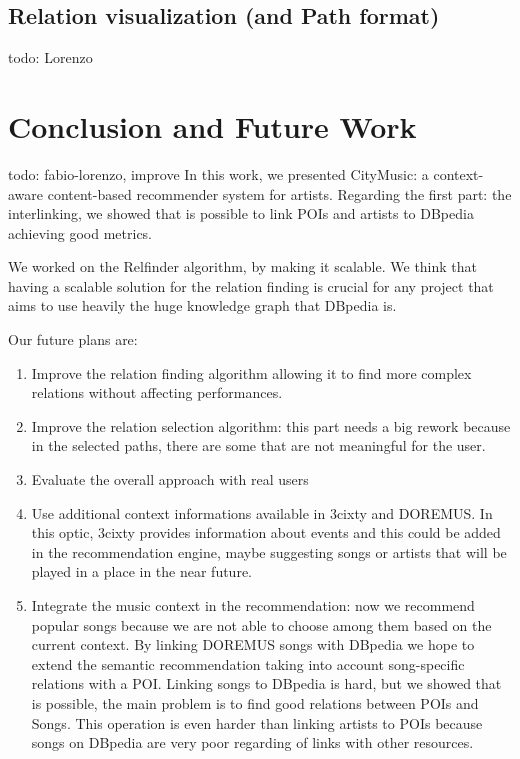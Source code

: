 \documentclass[paper=a4, fontsize=11pt]{scrartcl}
\begin{document}
\subsection{Relation visualization (and Path format)}
todo: Lorenzo
\section{Conclusion and Future Work}
todo: fabio-lorenzo, improve
In this work, we presented CityMusic: a context-aware content-based recommender system for artists. 
Regarding the first part: the interlinking, we showed that is possible to link POIs and artists to DBpedia achieving good metrics.

We worked on the Relfinder algorithm, by making it scalable. We think that having a scalable solution for the relation finding is crucial for any project that aims to use heavily the huge knowledge graph that DBpedia is.

Our future plans are:
\begin{enumerate}
\item Improve the relation finding algorithm allowing it to find more complex relations without affecting performances.
\item Improve the relation selection algorithm: this part needs a big rework because in the selected paths, there are some that are not meaningful for the user.
\item Evaluate the overall approach with real users 
\item Use additional context informations available in 3cixty and DOREMUS. In this optic, 3cixty provides information about events and this could be added in the recommendation engine, maybe suggesting songs or artists that will be played in a place in the near future.
\item Integrate the music context in the recommendation: now we recommend popular songs because we are not able to choose among them based on the current context. By linking DOREMUS songs with DBpedia we hope to extend the semantic recommendation taking into account song-specific relations with a POI. Linking songs to DBpedia is hard, but we showed that is possible, the main problem is to find good relations between POIs and Songs. This operation is even harder than linking artists to POIs because songs on DBpedia are very poor regarding of links with other resources.
\end{enumerate}


\end{document}
